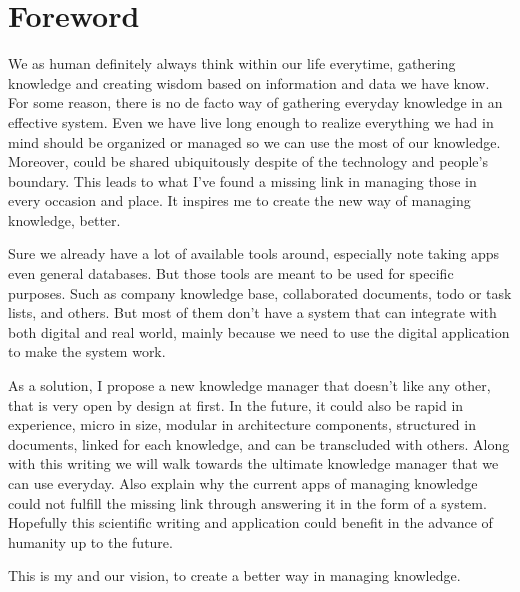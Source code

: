 \begingroup
\let\clearpage\relax
\let\cleardoublepage\relax

\chapter{Foreword}
\label{chap:foreword}

We as human definitely always think within our life everytime, gathering knowledge and creating wisdom based on information and data we have know. For some reason, there is no de facto way of gathering everyday knowledge in an effective system. Even we have live long enough to realize everything we had in mind should be organized or managed so we can use the most of our knowledge. Moreover, could be shared ubiquitously despite of the technology and people's boundary. This leads to what I've found a missing link in managing those in every occasion and place. It inspires me to create the new way of managing knowledge, better.

Sure we already have a lot of available tools around, especially note taking apps even general databases. But those tools are meant to be used for specific purposes. Such as company knowledge base, collaborated documents, todo or task lists, and others. But most of them don't have a system that can integrate with both digital and real world, mainly because we need to use the digital application to make the system work.

As a solution, I propose a new knowledge manager that doesn't like any other, that is very open by design at first. In the future, it could also be rapid in experience, micro in size, modular in architecture components, structured in documents, linked for each knowledge, and can be transcluded with others. Along with this writing we will walk towards the ultimate knowledge manager that we can use everyday. Also explain why the current apps of managing knowledge could not fulfill the missing link through answering it in the form of a system. Hopefully this scientific writing and application could benefit in the advance of humanity up to the future.

This is my and our vision, to create a better way in managing knowledge.

\endgroup
